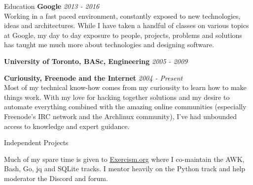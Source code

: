 \documentclass{resume}
\begin{document}
  \begin{rSection}{Education}
    {\bf Google} \hfill {\em 2013 - 2016} \\
    { Working in a fast paced environment, constantly exposed to new technologies, ideas and architectures. While I have taken a handful of classes on various topics at Google, my day to day exposure to people, projects, problems and solutions has taught me much more about technologies and designing software. }

    {\bf University of Toronto, BASc, Engineering} \hfill {\em 2005 - 2009}

    {\bf Curiousity, Freenode and the Internet} \hfill {\em 2004 - Present} \\
    { Most of my technical know-how comes from my curiousity to learn how to make things work. With my love for hacking together solutions and my desire to automate everything combined with the amazing online communities (especially Freenode's IRC network and the Archlinux community), I've had unbounded access to knowledge and expert guidance.}

  \end{rSection}

  \begin{rSection}{Independent Projects}
    \begin{rSubsection}{}{}{}{}
      \item Much of my spare time is given to \href{https://exercism.org/}{Exercism.org} where I co-maintain the AWK, Bash, Go, jq and SQLite tracks. I mentor heavily on the Python track and help moderator the Discord and forum.

    \end{rSubsection}
  \end{rSection}
\end{document}
